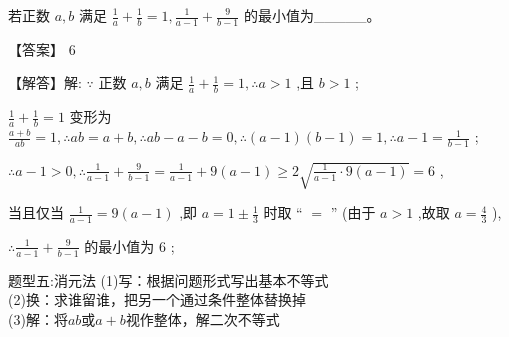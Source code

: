 \documentclass[11pt,a4paper]{article}
\begin{document}
\begin{problem} 
若正数 \(\displaystyle a,b\) 满足 \(\displaystyle \frac{1}{a} + \frac{1}{b} = 1,\frac{1}{a - 1} + \frac{9}{b - 1}\) 的最小值为\_\_\_\_\_。
\begin{jiexi}[55]
【答案】 6

【解答】解: \(\displaystyle \because\) 正数 \(\displaystyle a,b\) 满足 \(\displaystyle \frac{1}{a} + \frac{1}{b} = 1,\therefore a > 1\) ,且 \(\displaystyle b > 1\) ;

\(\displaystyle \frac{1}{a} + \frac{1}{b} = 1\) 变形为 \(\displaystyle \frac{a + b}{ab} = 1,\therefore {ab} = a + b,\therefore {ab} - a - b = 0,\therefore \left( {a - 1}\right) \left( {b - 1}\right)  = 1,\therefore a - 1 = \frac{1}{b - 1}\) ;

\(\displaystyle \therefore a - 1 > 0,\therefore \frac{1}{a - 1} + \frac{9}{b - 1} = \frac{1}{a - 1} + 9\left( {a - 1}\right)  \geq  2\sqrt{\frac{1}{a - 1} \cdot  9\left( {a - 1}\right) } = 6\) ,

当且仅当 \(\displaystyle \frac{1}{a - 1} = 9\left( {a - 1}\right)\) ,即 \(\displaystyle a = 1 \pm  \frac{1}{3}\) 时取 “ \(\displaystyle =\) ” (由于 \(\displaystyle a > 1\) ,故取 \(\displaystyle a = \frac{4}{3}\) ),

\(\displaystyle \therefore \frac{1}{a - 1} + \frac{9}{b - 1}\) 的最小值为 6 ;

\end{jiexi}
\end{problem}
\begin{tcolorbox} 
    \centering
    题型五:消元法
    \tcblower %
    (1)写：根据问题形式写出基本不等式\\
    (2)换：求谁留谁，把另一个通过条件整体替换掉\\
    (3)解：将$ab$或$a+b$视作整体，解二次不等式
\end{tcolorbox}
\end{document}
